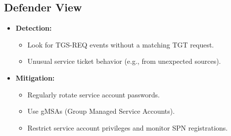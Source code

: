 \subsection{Defender View}
\begin{itemize}
    \item \textbf{Detection:}
    \begin{itemize}
        \item Look for TGS-REQ events without a matching TGT request.
        \item Unusual service ticket behavior (e.g., from unexpected sources).
    \end{itemize}
    \item \textbf{Mitigation:}
    \begin{itemize}
        \item Regularly rotate service account passwords.
        \item Use gMSAs (Group Managed Service Accounts).
        \item Restrict service account privileges and monitor SPN registrations.
    \end{itemize}
\end{itemize}
